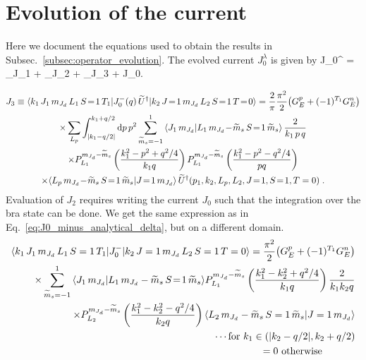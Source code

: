   \section{Evolution of the current}
  \label{Appendix:sec:evolution_current}

  Here we document the equations used to obtain the results in
  Subsec.~\ref{subsec:operator_evolution}.  The evolved current $J_0^{\lambda}$
  is given by
  \beq
  J_0^{\lambda} = _{J_1} +
  _{J_2} + _{J_3} + J_0\;.
  \eeq

  \begin{multline}
    J_3 \equiv \mbraket{{\thickmuskip=0mu k_1 \, J_1 \, \mJd \,
    L_1 \, S\!=\!1 \, T_1}}
    {J_0^-(q) \, \wt{U}^\dag}{{\thickmuskip=0mu k_2 \, J\!=\!1 \,
    \mJd \, L_2 \, S\!=\!1 \,
    T\!=\!0}} = \frac{2}{\pi} \frac{\pi^2}{2} \big(G_E^p + (-1)^{T_1} G_E^n
    \big) \\
    \times
    \sum_{L_p} \int_{|k_1 - q/2|}^{k_1 + q/2} \dd p \, p^2 \sum_{\mst = -1}^1
    \braket{J_1 \, \mJd}{L_1 \, \mJd \!- \!\mst \, {S\!=\!1}
    \, \mst} \, \frac{2}{k_1 \, p \, q} \\
    \times
    P_{L_1}^{\mJd - \mst}\left(\frac{k_1^2 - p^2 + q^2/4}{k_1 q}
    \right)
    P_{L_1}^{\mJd - \mst}\left(
    \frac{k_1^2 - p^2 - q^2/4}{p q}
    \right) \\
    \times
    \CG{L_p}{\mJd\!-\!\mst}{S\!=\!1}{\mst}{J\!=\!1}{\mJd} \,
    \wt{U}^\dag({\thickmuskip=0mu p_1, k_2, L_p, L_2, J\!=\!1, S\!=\!1,
    T = 0}) \;.
  \end{multline}
  Evaluation of $J_2$ requires writing the current $J_0$ such
  that the integration over the bra state can be done.  We get the
  same expression as in Eq.~\eqref{eq:J0_minus_analytical_delta},
  but on a different domain.
  \begin{align}
  \langle k_1 \, J_1 \, m_{J_d} \, L_1 \, S=1 \, T_1|J_0^-|k_2\, J=1 \, m_{J_d} \, L_2 \, S=1 \, T=0\rangle = \frac{\pi^2}{2}
  \big(G_E^p + (-1)^{T_1} G_E^n\big) \nonumber \\
  \times \sum_{\widetilde{m}_s=-1}^{1} {\langle J_1 \, m_{J_d}|L_1 \, m_{J_d} - \widetilde{m}_s \, S\!=\!1 \, \widetilde{m}_s\rangle}
  P_{L_1}^{m_{J_d} - \widetilde{m}_s} \left(\frac{k_1^2 - k_2^2 + q^2/4}{k_1 q}
  \right) \frac{2}{k_1 k_2 q} \nonumber \\
  \times
  P_{L_2}^{m_{J_d} - \widetilde{m}_s} \left(\frac{k_1^2 - k_2^2 - q^2/4}{k_2 q}
  \right)
  {\langle L_2\,m_{J_d} - \widetilde{m}_s\,S=1\,\widetilde{m}_s|J=1\,m_{J_d}\rangle} \nonumber \\
  \cdots {\rm for~} k_1 \in (|k_2 - q/2|, k_2 + q/2) \nonumber \\
  = 0 {\rm ~otherwise~~~~~~~~~~}
  \label{eq:J0_minus_analytical_delta2}
  \end{align}

